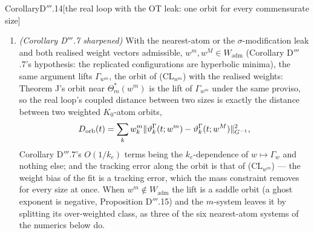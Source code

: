 \begin{thm}{Corollary}{D$'''$.14}[the real loop with the OT leak: one orbit for every commensurate size]
\begin{enumerate}[label=\textup{(\roman*)}]
    matching masses, where the residual vanishes, the ghosts' exponent is exactly $\sigma_0/k_e > 0$ --- and it is
    Theorem J's orbit $\Gamma_m$ at $\Theta^*_m(q)$, with the basin (c) of that theorem, whenever it lies in Theorem
    J's uniqueness ball $\norm{\Theta - \Theta^*_m(q)}_{G_m^{-1}}\le\rho_0(m)$: with
    $\norm{\Theta}^2_w := \sum_kq_k\norm{\vartheta_k}^2_{\Ginv}$ the lift's $G_m^{-1}$-distance to $\Theta^*_m(q)$
    is $\sqrt m$ times the weighted distance, so the condition is
    $\sqrt m\cdot\sup_t\norm{\Theta^q_p(t) - \Theta^*(q)}_w\le\rho_0(m)$, satisfied for
    $k_e\ge\max\{k_0(m),\sqrt m\,C_q/\rho_0(m)\}$ by Theorem J(a)'s
    $\sup_t\norm{\Theta^q_p(t) - \Theta^*(q)}_w\le C_q/k_e$. Along the lift the orbit measure
    $(1/m)\sum_i\delta_{\vartheta_i(t)} = \sum_kq_k\delta_{\vartheta_k(t)}$, the learned function
    $\sum_kq_k\tilde\Phi(\cdot\,;\vartheta_k(t))$, the plant's orbit $x_p(t)$ and the tracking error $e(t)$ are the
    same for every commensurate $m$ at every $t$ --- exactly, not up to $O(1/k_e)$: the finite-size floor of the real
    loop (Corollary D$'''$.7) is zero.
  \item \emph{(Corollary D$'''$.7 sharpened)} With the nearest-atom or the $\sigma$-modification leak and both
    realised weight vectors admissible, $w^m, w^M\in W_{\mathrm{adm}}$ (Corollary D$'''$.7's hypothesis: the
    replicated configurations are hyperbolic minima), the same argument lifts $\Gamma_{w^m}$, the orbit of
    \textup{(CL$_{w^m}$)} with the realised weights: Theorem J's orbit near $\Theta^*_m(w^m)$ is the lift of
    $\Gamma_{w^m}$ under the same proviso, so the real loop's coupled distance between two sizes is exactly the
    distance between two weighted $K_0$-atom orbits,
    \[
      D_{\mathrm{orb}}(t) = \sum_kw^m_k\lVert \vartheta^\Gamma_k(t;w^m) - \vartheta^\Gamma_k(t;w^M)\rVert^2_{G^{-1}},
    \]
    Corollary D$'''$.7's $O(1/k_e)$ terms being the $k_e$-dependence of $w\mapsto\Gamma_w$ and nothing else; and the
    tracking error along the orbit is that of \textup{(CL$_{w^m}$)} --- the weight bias of the fit is a tracking
    error, which the mass constraint removes for every size at once. When $w^m\notin W_{\mathrm{adm}}$ the lift is a
    saddle orbit (a ghost exponent is negative, Proposition D$'''$.15) and the $m$-system leaves it by splitting its
    over-weighted class, as three of the six nearest-atom systems of the numerics below do.
\end{enumerate}
\end{thm}
